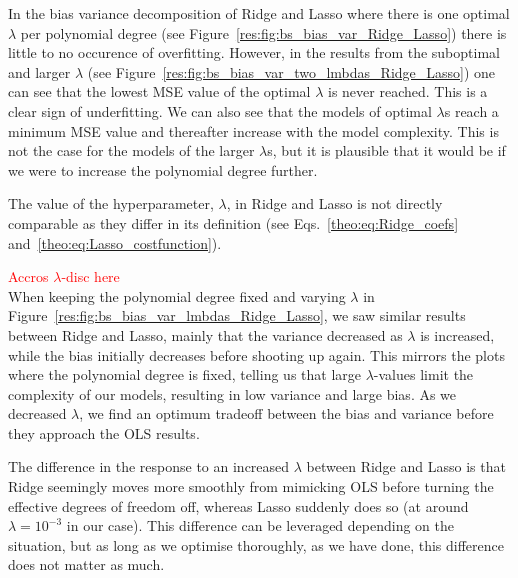 \documentclass[twocolumn,english,notitlepage]{article}
\newcommand{\comment}[1]{\textcolor{red}{#1}}
\begin{document}
            In the bias variance decomposition of Ridge and Lasso where there is one optimal $\lambda$ per polynomial degree (see Figure~\ref{res:fig:bs_bias_var_Ridge_Lasso}) there is little to no occurence of overfitting. However, in the results from the suboptimal and larger $\lambda$ (see Figure~\ref{res:fig:bs_bias_var_two_lmbdas_Ridge_Lasso}) one can see that the lowest MSE value of the optimal $\lambda$ is never reached. This is a clear sign of underfitting. We can also see that the models of optimal $\lambda$s reach a minimum MSE value and thereafter increase with the model complexity. This is not the case for the models of the larger $\lambda$s, but it is plausible that it would be if we were to increase the polynomial degree further. 
            
            The value of the hyperparameter, $\lambda$, in Ridge and Lasso is not directly comparable as they differ in its definition (see Eqs.~\eqref{theo:eq:Ridge_coefs} and~\eqref{theo:eq:Lasso_costfunction}).   


            \comment{Accros $\lambda$-disc here}\\
            When keeping the polynomial degree fixed and varying $\lambda$ in Figure~\ref{res:fig:bs_bias_var_lmbdas_Ridge_Lasso}, we saw similar results between Ridge and Lasso, mainly that the variance decreased as $\lambda$ is increased, while the bias initially decreases before shooting up again. This mirrors the plots where the polynomial degree is fixed, telling us that large $\lambda$-values limit the complexity of our models, resulting in low variance and large bias. As we decreased $\lambda$, we find an optimum tradeoff between the bias and variance before they approach the OLS results.

            The difference in the response to an increased $\lambda$ between Ridge and Lasso is that Ridge seemingly moves more smoothly from mimicking OLS before turning the effective degrees of freedom off, whereas Lasso suddenly does so (at around $\lambda=10^{-3}$ in our case). This difference can be leveraged depending on the situation, but as long as we optimise thoroughly, as we have done, this difference does not matter as much.
\end{document}
